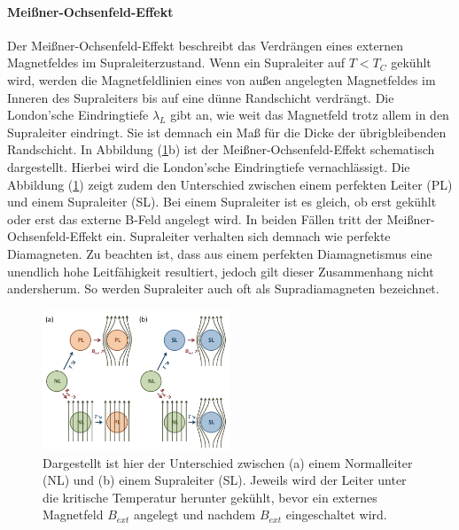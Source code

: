 \paragraph{Mei{\ss}ner-Ochsenfeld-Effekt}
Der Mei{\ss}ner-Ochsenfeld-Effekt beschreibt das Verdr\"{a}ngen eines externen Magnetfeldes im Supraleiterzustand.
Wenn ein Supraleiter auf $T < T_C$ gek\"{u}hlt wird, werden die Magnetfeldlinien eines von au{\ss}en angelegten Magnetfeldes im Inneren des Supraleiters bis auf eine d\"{u}nne Randschicht verdr\"{a}ngt.
Die London'sche Eindringtiefe $\lambda_L$ gibt an, wie weit das Magnetfeld trotz allem in den Supraleiter eindringt.
Sie ist demnach ein Ma{\ss} f\"{u}r die Dicke der \"{u}brigbleibenden Randschicht.
In Abbildung (\ref{abb:MOEffekt}b) ist der Mei{\ss}ner-Ochsenfeld-Effekt schematisch dargestellt.
Hierbei wird die London'sche Eindringtiefe vernachl\"{a}ssigt.
Die Abbildung (\ref{abb:MOEffekt}) zeigt zudem den Unterschied zwischen einem perfekten Leiter (PL) und einem Supraleiter (SL).
Bei einem Supraleiter ist es gleich, ob erst gek\"{u}hlt oder erst das externe B-Feld angelegt wird.
In beiden F\"{a}llen tritt der Mei{\ss}ner-Ochsenfeld-Effekt ein.
Supraleiter verhalten sich demnach wie perfekte Diamagneten.
Zu beachten ist, dass aus einem perfekten Diamagnetismus eine unendlich hohe Leitf\"{a}higkeit resultiert, jedoch gilt dieser Zusammenhang nicht andersherum.
So werden Supraleiter auch oft als Supradiamagneten bezeichnet.
\begin{figure}
	\centering
	\includegraphics[width=0.5\textwidth]{Plots/MO_Effekt.png}
	\caption{Dargestellt ist hier der Unterschied zwischen (a) einem Normalleiter (NL) und (b) einem Supraleiter (SL). Jeweils wird der Leiter unter die kritische Temperatur herunter gek\"{u}hlt, bevor ein externes Magnetfeld $B_{ext}$ angelegt und nachdem $B_{ext}$ eingeschaltet wird. \cite{anleitung}}
	\label{abb:MOEffekt}
\end{figure}


